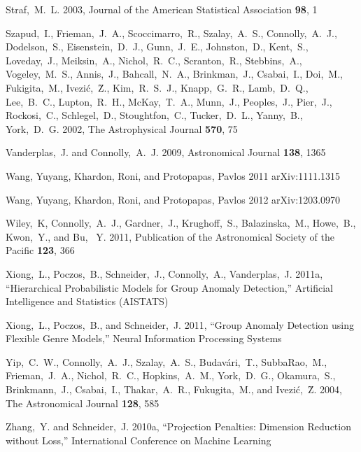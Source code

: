 \documentclass[useAMS,usenatbib,tightenlines,11pt,preprint]{aastex}
\begin{document}
\begin{thebibliography}{99}
Straf,~M.~L. 2003, Journal of the American Statistical Association {\bf 98}, 1

Szapud,~I., Frieman,~J.~A., Scoccimarro,~R., Szalay,~A.~S., Connolly,~A.~J.,
Dodelson,~S., Eisenstein,~D.~J., Gunn,~J.~E., Johnston,~D., Kent,~S.,
Loveday,~J., Meiksin,~A., Nichol,~R.~C., Scranton,~R., Stebbins,~A.,
Vogeley,~M.~S., Annis,~J., Bahcall,~N.~A., Brinkman,~J., Csabai,~I., Doi,~M.,
Fukigita,~M., Ivezi\'c,~\u Z., Kim,~R.~S.~J., Knapp,~G.~R., Lamb,~D.~Q.,
Lee,~B.~C., Lupton,~R.~H., McKay,~T.~A., Munn,~J., Peoples,~J., Pier,~J.,
Rockosi,~C., Schlegel,~D., Stoughtfon,~C., Tucker,~D.~L., Yanny,~B., York,~D.~G.
2002, The Astrophysical Journal {\bf 570}, 75

Vanderplas,~J. and Connolly,~A.~J. 2009,
Astronomical Journal {\bf 138}, 1365

Wang, Yuyang, Khardon, Roni, and Protopapas, Pavlos 2011
arXiv:1111.1315

Wang, Yuyang, Khardon, Roni, and Protopapas, Pavlos 2012
arXiv:1203.0970

Wiley,~K, Connolly,~A.~J., Gardner,~J., Krughoff,~S., Balazinska,~M., Howe,~B.,
Kwon,~Y., and Bu, ~Y. 2011, Publication of the Astronomical Society of the
Pacific {\bf 123}, 366

Xiong,~L., Poczos,~B., Schneider,~J., Connolly,~A., Vanderplas,~J. 2011a,
``Hierarchical Probabilistic Models for Group Anomaly Detection,''
Artificial Intelligence and Statistics (AISTATS)

Xiong,~L., Poczos,~B., and Schneider,~J. 2011, ``Group Anomaly Detection using Flexible
Genre Models,'' Neural Information Processing Systems

Yip,~C.~W., Connolly,~A.~J., Szalay,~A.~S., Budav\'ari,~T., SubbaRao,~M.,
Frieman,~J.~A., Nichol,~R.~C., Hopkins,~A.~M., York,~D.~G., Okamura,~S.,
Brinkmann,~J., Csabai,~I., Thakar,~A.~R., Fukugita,~M., 
and Ivezi\'c,~\u Z. 2004, The Astronomical Journal {\bf 128}, 585

Zhang,~Y. and Schneider,~J. 2010a, ``Projection Penalties: Dimension Reduction without
Loss,'' International Conference on Machine Learning


\end{thebibliography}
\end{document}
